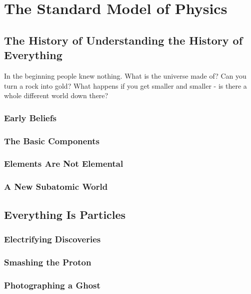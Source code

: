 \chapter{The Standard Model of Physics}\label{chap:SM}

\section{The History of Understanding the History of Everything}

In the beginning people knew nothing. What is the universe made of? Can you turn a rock into gold? What happens if you get smaller and smaller - is there a whole different world down there?

\subsection{Early Beliefs}

\subsection{The Basic Components}

\subsection{Elements Are Not Elemental}

\subsection{A New Subatomic World}

\section{Everything Is Particles}

\subsection{Electrifying Discoveries}

\subsection{Smashing the Proton}

\subsection{Photographing a Ghost}

